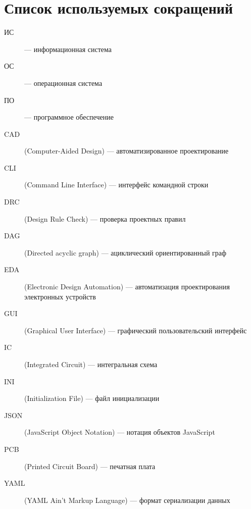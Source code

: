\chapter*{Список используемых сокращений}

\begin{description}
	\item[ИС] --- информационная система
	\item[ОС] --- операционная система
	\item[ПО] --- программное обеспечение
	\item[CAD] (Computer-Aided Design) --- автоматизированное проектирование
	\item[CLI] (Command Line Interface) --- интерфейс командной строки
	\item[DRC] (Design Rule Check) --- проверка проектных правил
	\item[DAG] (Directed acyclic graph) --- ациклический ориентированный граф
	\item[EDA] (Electronic Design Automation)
		--- автоматизация проектирования электронных устройств
	\item[GUI] (Graphical User Interface)
		--- графический пользовательский интерфейс
	\item[IC] (Integrated Circuit) --- интегральная схема
	\item[INI] (Initialization File) --- файл инициализации
	\item[JSON] (JavaScript Object Notation) --- нотация объектов JavaScript
	\item[PCB] (Printed Circuit Board) --- печатная плата
	\item[YAML] (YAML Ain't Markup Language) --- формат сериализации данных
\end{description}

